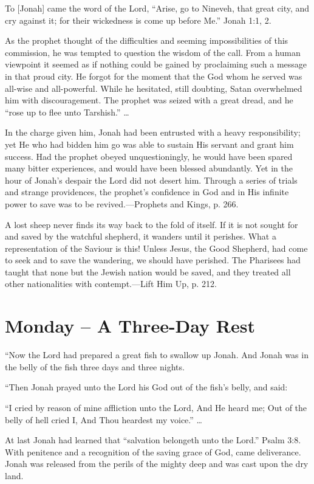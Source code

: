 \documentclass[a4paper, 10pt, twoside, headings=small]{scrartcl}
\begin{document}
\begin{multicols}{2}
To [Jonah] came the word of the Lord, “Arise, go to Nineveh, that great city, and cry against it; for their wickedness is come up before Me.” Jonah 1:1, 2.

As the prophet thought of the difficulties and seeming impossibilities of this commission, he was tempted to question the wisdom of the call. From a human viewpoint it seemed as if nothing could be gained by proclaiming such a message in that proud city. He forgot for the moment that the God whom he served was all-wise and all-powerful. While he hesitated, still doubting, Satan overwhelmed him with discouragement. The prophet was seized with a great dread, and he “rose up to flee unto Tarshish.” …

In the charge given him, Jonah had been entrusted with a heavy responsibility; yet He who had bidden him go was able to sustain His servant and grant him success. Had the prophet obeyed unquestioningly, he would have been spared many bitter experiences, and would have been blessed abundantly. Yet in the hour of Jonah’s despair the Lord did not desert him. Through a series of trials and strange providences, the prophet’s confidence in God and in His infinite power to save was to be revived.—Prophets and Kings, p. 266.

A lost sheep never finds its way back to the fold of itself. If it is not sought for and saved by the watchful shepherd, it wanders until it perishes. What a representation of the Saviour is this! Unless Jesus, the Good Shepherd, had come to seek and to save the wandering, we should have perished. The Pharisees had taught that none but the Jewish nation would be saved, and they treated all other nationalities with contempt.—Lift Him Up, p. 212.

\section*{Monday – A Three-Day Rest}

“Now the Lord had prepared a great fish to swallow up Jonah. And Jonah was in the belly of the fish three days and three nights.

“Then Jonah prayed unto the Lord his God out of the fish’s belly, and said:

“I cried by reason of mine affliction unto the Lord, And He heard me; Out of the belly of hell cried I, And Thou heardest my voice.” …

At last Jonah had learned that “salvation belongeth unto the Lord.” Psalm 3:8. With penitence and a recognition of the saving grace of God, came deliverance. Jonah was released from the perils of the mighty deep and was cast upon the dry land.


\end{multicols}
\end{document}
